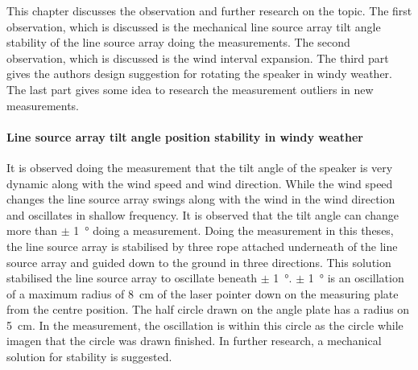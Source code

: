 This chapter discusses the observation and further research on the topic. The first observation, which is discussed is the mechanical line source array tilt angle stability of the line source array doing the measurements. The second observation, which is discussed is the wind interval expansion. The third part gives the authors design suggestion for rotating the speaker in windy weather. The last part gives some idea to research the measurement outliers in new measurements.


\paragraph{Line source array tilt angle position stability in windy weather} 
It is observed doing the measurement that the tilt angle of the speaker is very dynamic along with the wind speed and wind direction. While the wind speed changes the line source array swings along with the wind in the wind direction and oscillates in shallow frequency. It is observed that the tilt angle can change more than $\pm$ \SI{1}{\degree} doing a measurement.  Doing the measurement in this theses, the line source array is stabilised by three rope attached underneath of the line source array and guided down to the ground in three directions. This solution stabilised the line source array to oscillate beneath  $\pm$ \SI{1}{\degree}. $\pm$ \SI{1}{\degree} is an oscillation of a maximum radius of \SI{8}{\centi\meter} of the laser pointer down on the measuring plate from the centre position. The half circle drawn on the angle plate has a radius on \SI{5}{\centi\meter}. In the measurement, the oscillation is within this circle as the circle while imagen that the circle was drawn finished. In further research, a mechanical solution for stability is suggested. 



